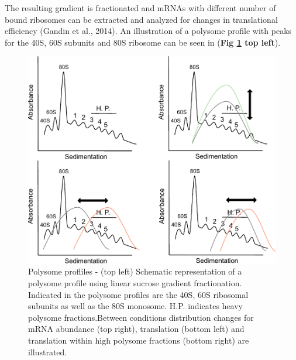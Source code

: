 \documentclass[12pt,openany]{book}
\begin{document}
The resulting gradient is fractionated and mRNAs with different number
of bound ribosomes can be extracted and analyzed for changes in
translational efficiency (Gandin et al., 2014). An illustration of a
polysome profile with peaks for the 40S, 60S subunits and 80S ribosome
can be seen in (\textbf{Fig \ref{fig:polysome} top left}).

\begin{figure}
    \includegraphics[width=0.9\linewidth]{./figures/polysome_shifts.pdf}
  \caption{Polysome profliles -  (top left) Schematic representation of a polysome profile using linear sucrose gradient fractionation. Indicated in the polysome profiles are the 40S, 60S ribosomal subunits as well as the 80S monosome. H.P. indicates heavy polysome fractions.Between conditions distribution changes for mRNA abundance (top right), translation (bottom left) and translation within high polysome fractions (bottom right) are illustrated. \label{fig:polysome}}
\end{figure}
\end{document}
